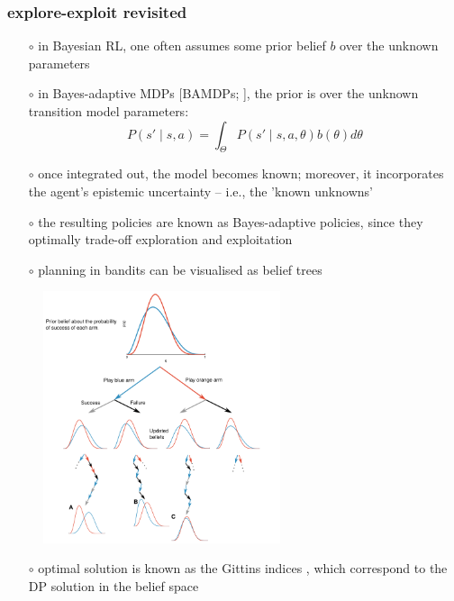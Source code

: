 \documentclass[aspectratio=169]{beamer}
\begin{document}
\begin{frame}
    \frametitle{explore-exploit revisited}
    \begin{itemize}
        \item[$\circ$] in Bayesian RL, one often assumes some prior belief $b$ over the unknown parameters
        \item[$\circ$] in Bayes-adaptive MDPs [BAMDPs; \citet{duffQLearningBanditProblems1995}], the prior is 
        over the unknown transition model parameters: 
        $$ P(s'\mid s, a) = \int_{\Theta} P(s' \mid s, a, \theta) b(\theta) d\theta $$ 
        \item[$\circ$] once integrated out, the model becomes known; moreover, it incorporates the agent's epistemic uncertainty -- i.e., the 'known unknowns'
        \item[$\circ$] the resulting policies are known as Bayes-adaptive policies, since they optimally trade-off exploration and exploitation
    \end{itemize}
\end{frame}

\begin{landscape}
    \begin{frame}
        \begin{itemize}
            \item[$\circ$] planning in bandits can be visualised as belief trees
        \end{itemize}
        \begin{figure}
            \includegraphics[width=0.62\textwidth]{guez_bandits.png}
        \end{figure}
        \hspace*{\fill} {\footnotesize \citet{guezSampleBasedSearchMethods2015}}
        \begin{itemize}
            \item[$\circ$] optimal solution is known as the Gittins indices \parencite{gittinsBanditProcessesDynamic1979}, 
            which correspond to the DP solution in the belief space 
        \end{itemize}
    \end{frame}
\end{landscape}
\end{document}
